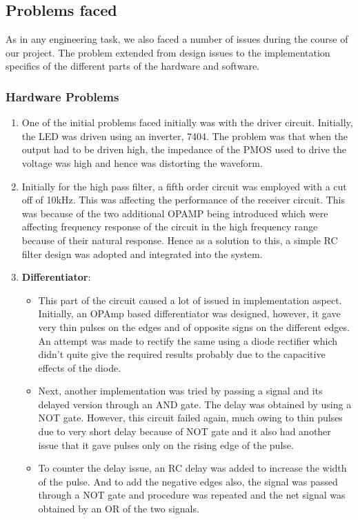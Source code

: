\documentclass{article}
\begin{document}
\subsection{Problems faced}
 As in any engineering task, we also faced a number of issues during the course of our project. The problem extended from design issues to the implementation specifics of the different parts of the hardware and software. 
\subsubsection{Hardware Problems}
 \begin{enumerate}
\item One of the initial problems faced initially was with the driver circuit. Initially, the LED was driven using an inverter, 7404. The problem was that when the output had to be driven high, the impedance of the PMOS used to drive the voltage was high and hence was distorting the waveform.
\item Initially for the high pass filter, a fifth order circuit was employed with a cut off of 10kHz. This was affecting the performance of the receiver circuit. This was because of the two additional OPAMP being introduced which were affecting frequency response of the circuit in the high frequency range because of their natural response. Hence as a solution to this, a simple RC filter design was adopted and integrated into the system.
\item \textbf{Differentiator}:
  \begin{itemize}
  \item This part of the circuit caused a lot of issued in implementation aspect. Initially, an OPAmp based differentiator was designed, however, it gave very thin pulses on the edges and of opposite signs on the different edges. An attempt was made to rectify the same using a diode rectifier which didn’t quite give the required results probably due to the capacitive effects of the diode.
  \item Next, another implementation was tried by passing a signal and its delayed version through an AND gate. The delay was obtained by using a NOT gate. However, this circuit failed again, much owing to thin pulses due to very short delay because of NOT gate and it also had another issue that it gave pulses only on the rising edge of the pulse.
  \item To counter the delay issue, an RC delay was added to increase the width of the pulse. And to add the negative edges also, the signal was passed through a NOT gate and procedure was repeated and the net signal was obtained by an OR of the two signals.

\end{itemize}
\end{enumerate}
\end{document}
